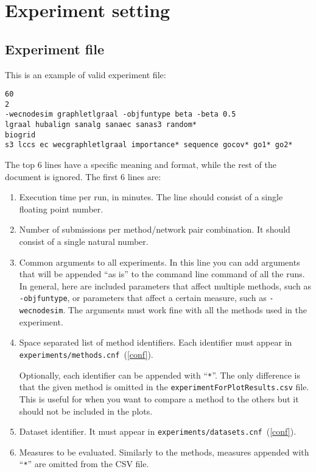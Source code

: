 \documentclass[]{article}
\begin{document}
\section{Experiment setting}
\subsection{Experiment file}\label{expfile}
This is an example of valid experiment file:
\begin{verbatim}
60
2
-wecnodesim graphletlgraal -objfuntype beta -beta 0.5
lgraal hubalign sanalg sanaec sanas3 random*
biogrid
s3 lccs ec wecgraphletlgraal importance* sequence gocov* go1* go2*
\end{verbatim}
The top 6 lines have a specific meaning and format, while the rest of the document is ignored.
The first 6 lines are:
\begin{enumerate}
\item Execution time per run, in minutes. The line should consist of a single floating point number.
\item Number of submissions per method/network pair combination. It should consist of a single natural number.
\item Common arguments to all experiments. In this line you can add arguments that will be appended ``as is'' to the command line command of all the runs. In general, here are included parameters that affect multiple methods, such as \verb|-objfuntype|, or parameters that affect a certain measure, such as \verb|-wecnodesim|. The arguments must work fine with all the methods used in the experiment.

\item Space separated list of method identifiers. Each identifier must appear in \verb|experiments/methods.cnf|~(\ref{conf}).

Optionally, each identifier can be appended with ``\verb|*|''. The only difference is that the given method is omitted in the \verb|experimentForPlotResults.csv| file. This is useful for when you want to compare a method to the others but it should not be included in the plots.
\item Dataset identifier. It must appear in \verb|experiments/datasets.cnf|~(\ref{conf}).
\item Measures to be evaluated. Similarly to the methods, measures appended with ``\verb|*|'' are omitted from the CSV file.
\end{enumerate}
\end{document}
